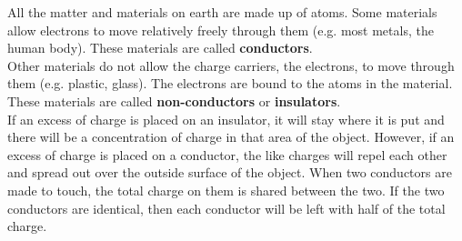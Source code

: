 All the matter and materials on earth are made up of atoms.
Some materials allow electrons to move relatively freely
through them (e.g. most metals, the human body).
These materials are called \textbf{conductors}.\\

Other materials do not allow the charge carriers, the electrons, to move
through them (e.g. plastic, glass).
The electrons are bound to the atoms in the material. These materials are called
\textbf{non-conductors} or \textbf{insulators}.\\

If an excess of charge is placed on an insulator, it will stay
where it is put and there will be a concentration of charge in
that area of the object. However, if an excess of charge is placed
on a conductor, the like charges will repel each other
and spread out over the outside surface of the object. When two conductors
are made to touch, the total charge on them is shared between the
two. If the two conductors are identical, then each conductor will
be left with half of the total charge.


